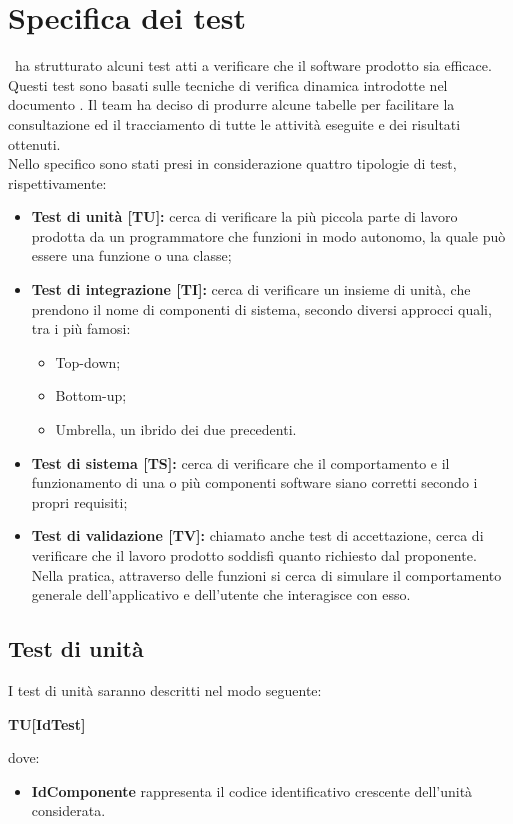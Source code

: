 \documentclass[../PianoDiQualifica.tex]{subfiles}
\begin{document}
\section{Specifica dei test}
\kpanic\ ha strutturato alcuni test atti a verificare che il software prodotto sia efficace. Questi test sono basati sulle tecniche di verifica dinamica introdotte nel documento \normediprogettov. Il team ha deciso di produrre alcune tabelle per facilitare la consultazione ed il tracciamento di tutte le attività eseguite e dei risultati ottenuti.\\ Nello specifico sono stati presi in considerazione quattro tipologie di test, rispettivamente:
\begin{itemize}
	\item \textbf{Test di unità [TU]:} cerca di verificare la più piccola parte di lavoro prodotta da un programmatore che funzioni in modo autonomo, la quale può essere una funzione o una classe; 
	\item \textbf{Test di integrazione [TI]:} cerca di verificare un insieme di unità, che prendono il nome di componenti di sistema, secondo diversi approcci quali, tra i più famosi:
	\begin{itemize}
		\item Top-down;
		\item Bottom-up;
		\item Umbrella, un ibrido dei due precedenti.
	\end{itemize}
	\item \textbf{Test di sistema [TS]:} cerca di verificare che il comportamento e il funzionamento di una o più componenti software siano corretti secondo i propri requisiti;
	\item \textbf{Test di validazione [TV]:} chiamato anche test di accettazione, cerca di verificare che il lavoro prodotto soddisfi quanto richiesto dal proponente. Nella pratica, attraverso delle funzioni si cerca di simulare il comportamento generale dell'applicativo e dell'utente che interagisce con esso.
\end{itemize}

	\newpage
	\subsection{Test di unità}
	I test di unità saranno descritti nel modo seguente:
	\begin{center}
		\textbf{TU[IdTest]}
	\end{center}		
	dove:
	\begin{itemize}
		\item \textbf{IdComponente} rappresenta il codice identificativo crescente dell'unità considerata.
	\end{itemize}
	
\end{document}
